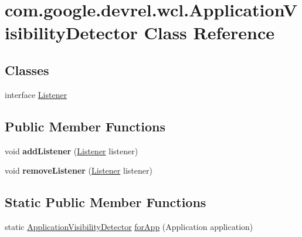 \hypertarget{classcom_1_1google_1_1devrel_1_1wcl_1_1ApplicationVisibilityDetector}{}\section{com.\+google.\+devrel.\+wcl.\+Application\+Visibility\+Detector Class Reference}
\label{classcom_1_1google_1_1devrel_1_1wcl_1_1ApplicationVisibilityDetector}
\subsection*{Classes}
\begin{DoxyCompactItemize}
\item 
interface \hyperlink{interfacecom_1_1google_1_1devrel_1_1wcl_1_1ApplicationVisibilityDetector_1_1Listener}{Listener}
\end{DoxyCompactItemize}
\subsection*{Public Member Functions}
\begin{DoxyCompactItemize}
\item 
void {\bfseries add\+Listener} (\hyperlink{interfacecom_1_1google_1_1devrel_1_1wcl_1_1ApplicationVisibilityDetector_1_1Listener}{Listener} listener)\hypertarget{classcom_1_1google_1_1devrel_1_1wcl_1_1ApplicationVisibilityDetector_a538304e90a693a8d5dd787363666dbe9}{}\label{classcom_1_1google_1_1devrel_1_1wcl_1_1ApplicationVisibilityDetector_a538304e90a693a8d5dd787363666dbe9}

\item 
void {\bfseries remove\+Listener} (\hyperlink{interfacecom_1_1google_1_1devrel_1_1wcl_1_1ApplicationVisibilityDetector_1_1Listener}{Listener} listener)\hypertarget{classcom_1_1google_1_1devrel_1_1wcl_1_1ApplicationVisibilityDetector_aed2bc00a9ab7aec16104e83a7b329092}{}\label{classcom_1_1google_1_1devrel_1_1wcl_1_1ApplicationVisibilityDetector_aed2bc00a9ab7aec16104e83a7b329092}

\end{DoxyCompactItemize}
\subsection*{Static Public Member Functions}
\begin{DoxyCompactItemize}
\item 
static \hyperlink{classcom_1_1google_1_1devrel_1_1wcl_1_1ApplicationVisibilityDetector}{Application\+Visibility\+Detector} \hyperlink{classcom_1_1google_1_1devrel_1_1wcl_1_1ApplicationVisibilityDetector_a420e75d4b9c7eedef748b631e1935f66}{for\+App} (Application application)
\end{DoxyCompactItemize}


